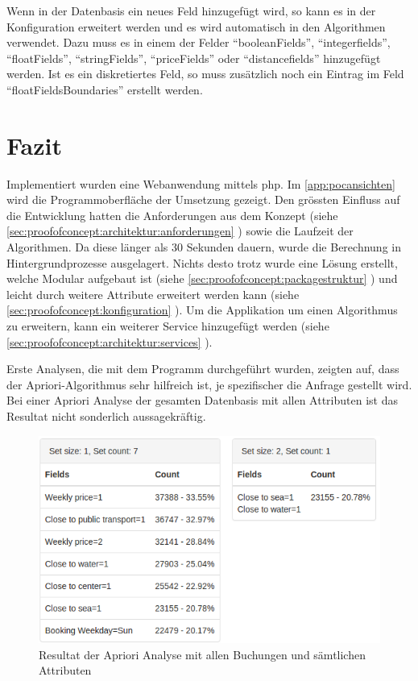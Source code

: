 Wenn in der Datenbasis ein neues Feld hinzugefügt wird, so kann es in der Konfiguration erweitert werden und es wird automatisch in den Algorithmen verwendet. Dazu muss es in einem der Felder "`booleanFields"', "`integerfields"', "`floatFields"', "`stringFields"', "`priceFields"' oder "`distancefields"' hinzugefügt werden. Ist es ein diskretiertes Feld, so muss zusätzlich noch ein Eintrag im Feld "`floatFieldsBoundaries"' erstellt werden.


\section{Fazit}
\label{sec:proofofconcept:fazit}
Implementiert wurden eine Webanwendung mittels \gls{php}. Im \cref{app:pocansichten} wird die Programmoberfläche der Umsetzung gezeigt. Den grössten Einfluss auf die Entwicklung hatten die Anforderungen aus dem Konzept (siehe \cref{sec:proofofconcept:architektur:anforderungen} ) sowie die Laufzeit der Algorithmen. Da diese länger als 30 Sekunden dauern, wurde die Berechnung in Hintergrundprozesse ausgelagert. Nichts desto trotz wurde eine Lösung erstellt, welche Modular aufgebaut ist (siehe \cref{sec:proofofconcept:packagestruktur} ) und leicht durch weitere Attribute erweitert werden kann (siehe \cref{sec:proofofconcept:konfiguration} ). Um die Applikation um einen Algorithmus zu erweitern, kann ein weiterer Service hinzugefügt werden (siehe \cref{sec:proofofconcept:architektur:services} ).

Erste Analysen, die mit dem Programm durchgeführt wurden, zeigten auf, dass der Apriori-Algorithmus sehr hilfreich ist, je spezifischer die Anfrage gestellt wird. Bei einer Apriori Analyse der gesamten Datenbasis mit allen Attributen ist das Resultat nicht sonderlich aussagekräftig. 

\begin{figure}[H]
	\RawFloats
	\centering
	\includegraphics[width=1\textwidth]{images/result-of-everything}
	\caption{Resultat der Apriori Analyse mit allen Buchungen und sämtlichen Attributen}
	\label{fig:proofofconcept:fazit:1}
\end{figure}

